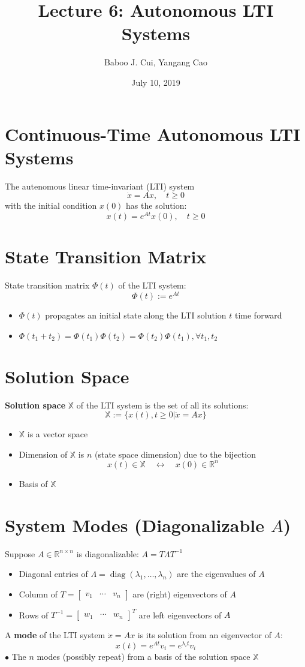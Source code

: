 \documentclass[10pt,a4paper,oneside]{article}
\date{July 10, 2019}
\author{Baboo J. Cui, Yangang Cao}
\title{Lecture 6: Autonomous LTI Systems}
\begin{document}
\maketitle
\tableofcontents
\newpage
\section{Continuous-Time Autonomous LTI Systems}
The autenomous linear time-invariant (LTI) system
\[
\dot{x}=Ax, \quad t\geq0
\]
with the initial condition $x(0)$ has the solution:
\[
x(t)=e^{A t} x(0),\quad t\geq0
\]
\section{State Transition Matrix}
State transition matrix $\Phi(t)$ of the LTI  system:
\[
\Phi(t) :=e^{A t}
\]
\begin{itemize}
\item $\Phi(t)$ propagates an initial state along the LTI solution $t$ time forward
\item $\Phi\left(t_{1}+t_{2}\right)=\Phi\left(t_{1}\right) \Phi\left(t_{2}\right)=\Phi\left(t_{2}\right) \Phi\left(t_{1}\right), \forall t_{1}, t_{2}$
\end{itemize}
\section{Solution Space}
{\bfseries Solution space} $\mathbb{X}$ of the LTI system is the set of all its solutions:
\[
\mathbb{X} :=\{x(t), t \geq 0 | \dot{x}=A x\}
\]
\begin{itemize}
\item $\mathbb{X}$ is a vector space
\item Dimension of $\mathbb{X}$ is $n$ (state space dimension) due to the bijection
\[
x(t) \in \mathbb{X} \quad \leftrightarrow \quad x(0) \in \mathbb{R}^{n}
\]
\item Basis of $\mathbb{X}$
\end{itemize}
\section{System Modes (Diagonalizable $A$)}
Suppose $A \in \mathbb{R}^{n \times n}$ is diagonalizable: $A=T \Lambda T^{-1}$
\begin{itemize}
\item Diagonal entries of $\Lambda=\operatorname{diag}\left(\lambda_{1}, \ldots, \lambda_{n}\right)$ are the eigenvalues of $A$
\item Column of $T=\left[\begin{array}{lll}{v_{1}} & {\cdots} & {v_{n}}\end{array}\right]$ are (right) eigenvectors of $A$
\item Rows of $T^{-1}=\left[\begin{array}{lll}{w_{1}} & {\cdots} & {w_{n}}\end{array}\right]^{T}$ are  left eigenvectors of $A$
\end{itemize}
A {\bfseries mode} of the LTI system $\dot{x}=A x$ is its solution from an eigenvector of $A$:
\[
x(t)=e^{A t} v_{i}=e^{\lambda_{i} t} v_{i}
\]
$\bullet$ The $n$ modes (possibly repeat) from a basis of the solution space $\mathbb{X}$
\end{document}

